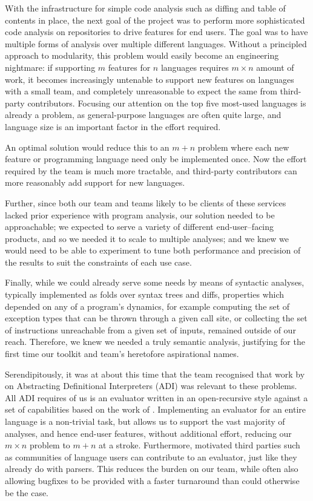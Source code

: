 \documentclass[acmsmall,fleqn]{acmart}
\begin{document}
With the infrastructure for simple code analysis such as diffing and table of
contents in place, the next goal of the project was to perform more
sophisticated code analysis on repositories to drive features for end users. The
goal was to have multiple forms of analysis over multiple different languages.
Without a principled approach to modularity, this problem would easily become an
engineering nightmare: if supporting $m$ features for $n$ languages requires $m
\times n$ amount of work, it becomes increasingly untenable to support new
features on languages with a small team, and completely unreasonable to expect
the same from third-party contributors. Focusing our attention on the top five
most-used languages is already a problem, as general-purpose languages are often
quite large, and language size is an important factor in the effort required.

An optimal solution would reduce this to an $m + n$ problem where each new feature
or programming language need only be implemented once. Now the effort required
by the team is much more tractable, and third-party contributors can more
reasonably add support for new languages.

Further, since both our team and teams likely to be clients of these services
lacked prior experience with program analysis, our solution needed to be approachable;
we expected to serve a variety of different end-user–facing products, and so we
needed it to scale to multiple analyses; and we knew we would need to be able to
experiment to tune both performance and precision of the results to suit the
constraints of each use case.

Finally, while we could already serve some needs by means of syntactic analyses,
typically implemented as folds over syntax trees and diffs, properties which
depended on any of a program's dynamics, for example computing the set of
exception types that can be thrown through a given call site, or collecting the
set of instructions unreachable from a given set of inputs, remained outside of our
reach. Therefore, we knew we needed a truly semantic analysis, justifying for the
first time our toolkit and team's heretofore aspirational names.

Serendipitously, it was at about this time that the team recognised that work by
\citet{Darais17Abstracting} on Abstracting Definitional Interpreters (ADI) was
relevant to these problems. All ADI requires of us is an evaluator written in an
open-recursive style against a set of capabilities based on the work of
\citet{Horn10Abstracting}. Implementing an evaluator for an entire language is a
non-trivial task, but allows us to support the vast majority of analyses, and
hence end-user features, without additional effort, reducing our $m \times n$
problem to $m + n$ at a stroke. Furthermore, motivated third parties such as
communities of language users can contribute to an evaluator, just like they
already do with parsers. This reduces the burden on our team, while often also
allowing bugfixes to be provided with a faster turnaround than could
otherwise be the case.
\end{document}
